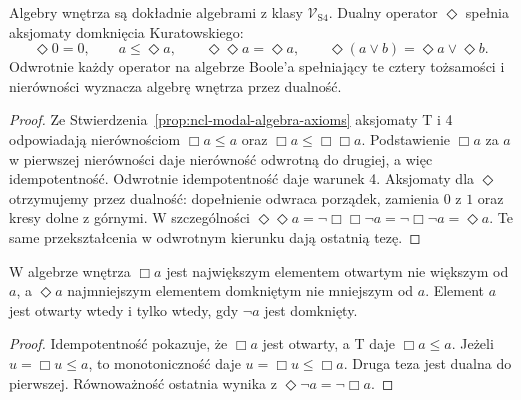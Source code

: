 \begin{stwierdzenie}
\label{prop:ncl-modal-interior-S4}
Algebry wnętrza są dokładnie algebrami z klasy
$\mathcal V_{\mathrm{S4}}$.
Dualny operator $\Diamond$ spełnia aksjomaty
domknięcia Kuratowskiego:
\[
 \Diamond0=0,\qquad a\leq\Diamond a,\qquad
 \Diamond\Diamond a=\Diamond a,\qquad
 \Diamond(a\vee b)=\Diamond a\vee\Diamond b.
\]
Odwrotnie każdy operator na algebrze Boole'a
spełniający te cztery tożsamości i nierówności
wyznacza algebrę wnętrza przez dualność.
\end{stwierdzenie}
\begin{proof}
Ze Stwierdzenia~\ref{prop:ncl-modal-algebra-axioms}
aksjomaty T i 4 odpowiadają nierównościom
$\Box a\leq a$ oraz $\Box a\leq\Box\Box a$.
Podstawienie $\Box a$ za $a$ w pierwszej
nierówności daje nierówność odwrotną do drugiej,
a więc idempotentność. Odwrotnie idempotentność
daje warunek 4.
Aksjomaty dla $\Diamond$ otrzymujemy przez
dualność: dopełnienie odwraca porządek,
zamienia $0$ z $1$ oraz kresy dolne z górnymi.
W szczególności
$\Diamond\Diamond a=\neg\Box\Box\neg a
=\neg\Box\neg a=\Diamond a$.
Te same przekształcenia w odwrotnym kierunku
dają ostatnią tezę.
\end{proof}

\begin{lemat}
\label{lem:ncl-modal-interior-extremal}
W algebrze wnętrza $\Box a$ jest największym
elementem otwartym nie większym od $a$,
a $\Diamond a$ najmniejszym elementem
domkniętym nie mniejszym od $a$.
Element $a$ jest otwarty wtedy i tylko wtedy,
gdy $\neg a$ jest domknięty.
\end{lemat}
\begin{proof}
Idempotentność pokazuje, że $\Box a$ jest
otwarty, a T daje $\Box a\leq a$.
Jeżeli $u=\Box u\leq a$, to monotoniczność
daje $u=\Box u\leq\Box a$.
Druga teza jest dualna do pierwszej.
Równoważność ostatnia wynika z
$\Diamond\neg a=\neg\Box a$.
\end{proof}


